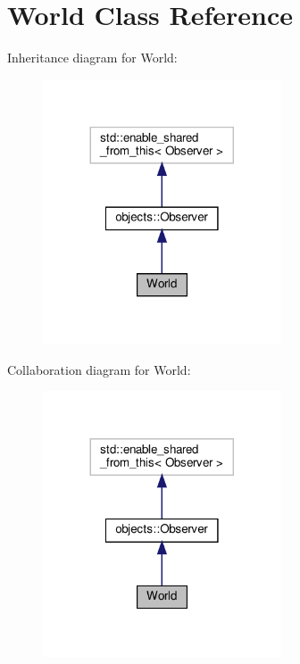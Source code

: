 \hypertarget{classWorld}{}\section{World Class Reference}
\label{classWorld}


Inheritance diagram for World\+:
\nopagebreak
\begin{figure}[H]
\begin{center}
\leavevmode
\includegraphics[width=200pt]{classWorld__inherit__graph}
\end{center}
\end{figure}


Collaboration diagram for World\+:
\nopagebreak
\begin{figure}[H]
\begin{center}
\leavevmode
\includegraphics[width=200pt]{classWorld__coll__graph}
\end{center}
\end{figure}
